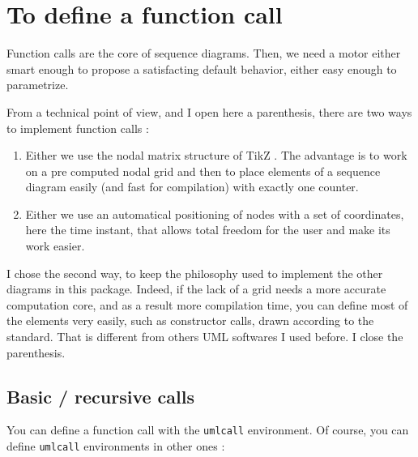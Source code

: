 \documentclass[a4paper,11pt]{report}
\newcommand{\inputTikZ}[1]{%
  }%
\newcommand{\inputTikZ}[1]{%
    \texttt{[image: fig/\#1.pdf]}%
  }%
\newcommand{\TikZ}{{\sc TikZ} \xspace}
\begin{document}
\begin{minipage}{0.5\textwidth}

\end{minipage}
\begin{minipage}{0.5\textwidth}
\begin{center}
\inputTikZ{objectfont}
\end{center}
\end{minipage}

\section{To define a function call}\label{s.calls}

Function calls are the core of sequence diagrams. Then, we need a motor either smart enough to propose a satisfacting default behavior, either easy enough to parametrize.

From a technical point of view, and I open here a parenthesis, there are two ways to implement function calls :

\begin{enumerate}
\item Either we use the nodal matrix structure of \TikZ. The advantage is to work on a pre computed nodal grid and then to place elements of a sequence diagram easily (and fast for compilation) with exactly one counter.
\item Either we use an automatical positioning of nodes with a set of coordinates, here the time instant, that allows total freedom for the user and make its work easier.
\end{enumerate}

I chose the second way, to keep the philosophy used to implement the other diagrams in this package. Indeed, if the lack of a grid needs a more accurate computation core, and as a result more compilation time, you can define most of the elements very easily, such as constructor calls, drawn according to the standard. That is different from others UML softwares I used before. I close the parenthesis.

\subsection{Basic / recursive calls}\label{ss.call}

You can define a function call with the {\tt umlcall} environment. Of course, you can define {\tt umlcall} environments in other ones :

\medskip
\end{document}
